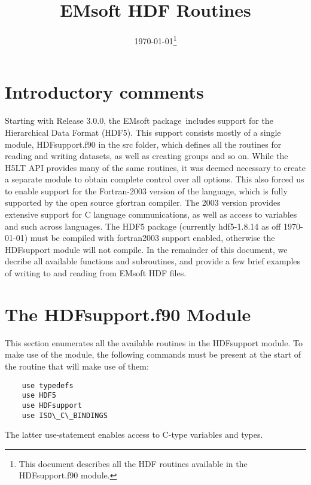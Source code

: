 \documentclass[DIV=calc, paper=letter, fontsize=11pt]{scrartcl}	 %
\title{EMsoft HDF Routines} %
\author{\vspace*{-0.7in}} %
\date{\today\protect\footnote{This document describes all the HDF routines available in the HDFsupport.f90 module.}}
\newcommand{\ctp}{\textsf{EMsoft} package}
\begin{document}
\maketitle
\renewcommand{\contentsname}{Table of Contents}
{\small\tableofcontents}

\newpage
\section{Introductory comments}
Starting with Release 3.0.0, the \ctp\ includes support for the Hierarchical Data Format (HDF5).  This support consists
mostly of a single module, \textsf{HDFsupport.f90} in the \textsf{src} folder, which defines all the routines for reading
and writing datasets, as well as creating groups and so on.  While the H5LT API provides many of the same routines, it was
deemed necessary to create a separate module to obtain complete control over all options.  This also forced us to enable
support for the Fortran-2003 version of the language, which is fully supported by the open source \textsf{gfortran} compiler. The
2003 version provides extensive support for C language communications, as well as access to variables and such across 
languages.  The HDF5 package (currently hdf5-1.8.14 as off \today) must be compiled with fortran2003 support enabled,
otherwise the \textsf{HDFsupport} module will not compile.
In the remainder of this document, we decribe all available functions and subroutines, and provide a few brief examples 
of writing to and reading from \textsf{EMsoft} HDF files.


\section{The HDFsupport.f90 Module}
This section enumerates all the available routines in the \textsf{HDFsupport} module.  To make use of the module, the following
commands must be present at the start of the routine that will make use of them:
\begin{verbatim}
	use typedefs
	use HDF5
	use HDFsupport
	use ISO\_C\_BINDINGS
\end{verbatim}
The latter use-statement enables access to C-type variables and types.
\end{document}
